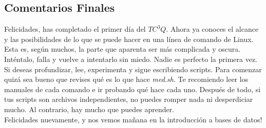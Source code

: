 \documentclass[10pt,letterpaper]{article}
\begin{document}
\subsection{Comentarios Finales}
Felicidades, has completado el primer d\'ia del $TC^3 Q$. Ahora ya conoces el alcance y las posibilidades de lo que se puede hacer en una l\'inea de comando de Linux. Esta es, seg\'un muchos, la parte que aparenta ser m\'as complicada y oscura. Int\'entalo, falla y vuelve a intentarlo sin miedo. Nadie es perfecto la primera vez.\\

Si deseas profundizar, lee, experimenta y sigue escribiendo scripts. Para comenzar quiz\'a sea bueno que revises qu\'e es lo que hace \emph{med.sh}. Te recomiendo leer los manuales de cada comando e ir probando qu\'e hace cada uno. Despu\'es de todo, si tus scripts son archivos independientes, no puedes romper nada ni desperdiciar mucho. Al contrario, hay mucho que puedes aprender.\\

Felicidades nuevamente, y nos vemos ma\~nana en la introducci\'on a bases de datos!
\end{document}
